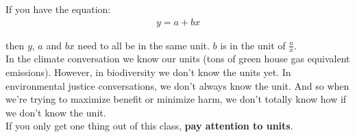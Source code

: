 \documentclass{article}
\begin{document}
If you have the equation: 
\begin{align}
    y = a + bx
\end{align}

then $y$, $a$ and $bx$ need to all be in the same unit. $b$ is in the unit of $\frac{a}{x}$.\\

In the climate conversation we know our units (tons of green house gas equivalent emissions). However, in biodiversity we don't know the units yet. In environmental justice conversations, we don't always know the unit. And so when we're trying to maximize benefit or minimize harm, we don't totally know how if we don't know the unit. \\

If you only get one thing out of this class, \textbf{pay attention to units}. 
\end{document}

